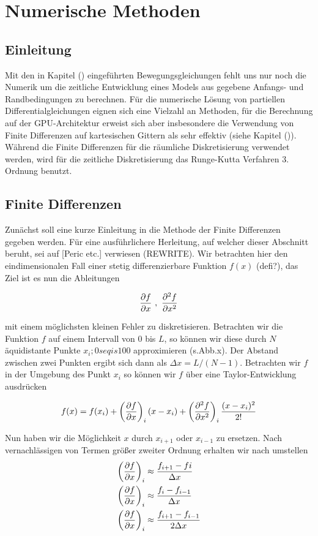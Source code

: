 \chapter{Numerische Methoden}

\section{Einleitung}

Mit den in Kapitel () eingeführten Bewegungsgleichungen fehlt uns nur noch die Numerik um die zeitliche Entwicklung eines Models aus
gegebene Anfangs- und Randbedingungen zu berechnen.
Für die numerische Lösung von partiellen Differentialgleichungen eignen sich eine Vielzahl an Methoden, für die Berechnung auf
der GPU-Architektur erweist sich aber insbesondere die Verwendung von Finite Differenzen  auf kartesischen Gittern
als sehr effektiv (siehe Kapitel ()).
Während die Finite Differenzen für die räumliche Diskretisierung verwendet werden, wird für die zeitliche Diskretisierung
das Runge-Kutta Verfahren 3. Ordnung benutzt.


\section{Finite Differenzen}
Zunächst soll eine kurze Einleitung in die Methode der Finite Differenzen gegeben werden.
Für eine ausführlichere Herleitung, auf welcher dieser Abschnitt beruht, sei  auf [Peric etc.] verwiesen (REWRITE).
Wir betrachten hier den eindimensionalen Fall einer stetig differenzierbare Funktion $f(x)$ (defi?), das Ziel ist es nun die Ableitungen

\begin{align}
\pdn[f]{x} \ , \ \pdn[^2f]{x^2}
\end{align}

mit einem möglichsten kleinen Fehler zu diskretisieren.
Betrachten wir die Funktion $f$ auf einem Intervall von 0 bis $L$, so können wir diese durch $N$ äquidistante Punkte $x_i; 0 seq i s 100$ approximieren (s.Abb.x).
Der Abstand zwischen zwei Punkten ergibt sich dann als $\Delta x = L/(N - 1)$.
Betrachten wir $f$ in der Umgebung des Punkt $x_i$ so können wir $f$ über eine Taylor-Entwicklung ausdrücken

\begin{align}
    f(x) = f(x_i) + \left(\pdn[f]{x} \right)_i (x - x_i) + \left(\pdn[^2f]{x^2}\right)_i \frac{(x-x_i)^2}{2!}
\end{align}

Nun haben wir die Möglichkeit $x$ durch $x_{i+1}$ oder $x_{i-1}$ zu ersetzen. Nach vernachlässigen von Termen größer zweiter Ordnung erhalten wir nach umstellen
\begin{align}
    \left(\pdn[f]{x}\right)_i &\approx \frac{f_{i+1} - f{i}}{\Delta x}\\
    \left(\pdn[f]{x}\right)_i &\approx \frac{f_{i} - f_{i-1}}{\Delta x}\\
    \left(\pdn[f]{x}\right)_i &\approx \frac{f_{i+1} - f_{i-1}}{2\Delta x}
\end{align}

